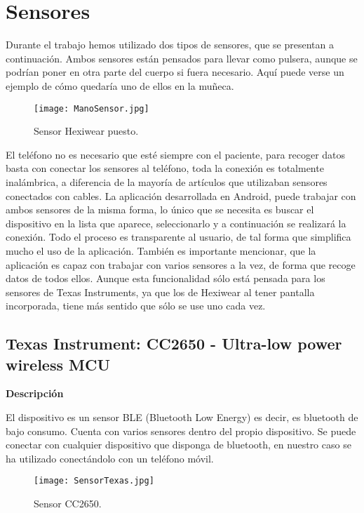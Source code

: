 \documentclass[11pt,spanish]{article}
\begin{document}
\section{Sensores}
Durante el trabajo hemos utilizado dos tipos de sensores, que se presentan a continuación. Ambos sensores están pensados para llevar como pulsera, aunque se podrían poner en otra parte del cuerpo si fuera necesario. Aquí puede verse un ejemplo de cómo quedaría uno de ellos en la muñeca.
\begin{figure}[h!]
  \centering
  \texttt{[image: ManoSensor.jpg]}
  \caption{Sensor Hexiwear puesto.}
\end{figure}

El teléfono no es necesario que esté siempre con el paciente, para recoger datos basta con conectar los sensores al teléfono, toda la conexión es totalmente inalámbrica, a diferencia de la mayoría de artículos que utilizaban sensores conectados con cables. La aplicación desarrollada en Android, puede trabajar con ambos sensores de la misma forma, lo único que se necesita es buscar el dispositivo en la lista que aparece, seleccionarlo y a continuación se realizará la conexión. Todo el proceso es transparente al usuario, de tal forma que simplifica mucho el uso de la aplicación. También es importante mencionar, que la aplicación es capaz con trabajar con varios sensores a la vez, de forma que recoge datos de todos ellos. Aunque esta funcionalidad sólo está pensada para los sensores de Texas Instruments, ya que los de Hexiwear al tener pantalla incorporada, tiene más sentido que sólo se use uno cada vez.
\newline

\subsection{Texas Instrument: CC2650 - Ultra-low power wireless MCU}
{\bf Descripción}
\newline

El dispositivo es un sensor BLE (Bluetooth Low Energy) es decir, es bluetooth de bajo consumo. Cuenta con varios sensores dentro del propio dispositivo. Se puede conectar con cualquier dispositivo que disponga de bluetooth, en nuestro caso se ha utilizado conectándolo con un teléfono móvil. 
\newline

\begin{figure}[h!]
  \centering
  \texttt{[image: SensorTexas.jpg]}
  \caption{Sensor CC2650.}
\end{figure}
\end{document}
